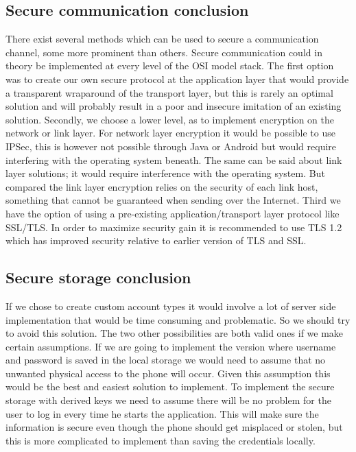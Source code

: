 \subsection{Secure communication conclusion}
There exist several methods which can be used to secure a communication channel, some more prominent than others. Secure communication could in theory be implemented at every level of the OSI model stack. The first option was to create our own secure protocol at the application layer that would provide a transparent wraparound of the transport layer, but this is rarely an optimal solution and will probably result in a poor and insecure imitation of an existing solution.
\newline
\newline
Secondly, we choose a lower level, as to implement encryption on the network or link layer\cite{bib:techtarget}. For network layer encryption it would be possible to use IPSec, this is however not possible through Java or Android\cite{bib:ispec} but would require interfering with the operating system beneath.  The same can be said about link layer solutions; it would require interference with the operating system. But compared the link layer encryption relies on the security of each link host, something that cannot be guaranteed when sending over the Internet.
\newline
\newline
Third we have the option of using a pre-existing application/transport layer protocol like SSL/TLS. In order to maximize security gain it is recommended to use TLS 1.2\cite{bib:ssl}  which has improved security relative to earlier version of TLS and SSL.

\subsection{Secure storage conclusion}
If we chose to create custom account types it would involve a lot of server side implementation that would be time consuming and problematic. So we should try to avoid this solution. The two other possibilities are both valid ones if we make certain assumptions.
\newline
\newline
If we are going to implement the version where username and password is saved in the local storage we would need to assume that no unwanted physical access to the phone will occur. Given this assumption this would be the best and easiest solution to implement.
\newline
\newline
To implement the secure storage with derived keys we need to assume there will be no problem for the user to log in every time he starts the application. This will make sure the information is secure even though the phone should get misplaced or stolen, but this is more complicated to implement than saving the credentials locally.